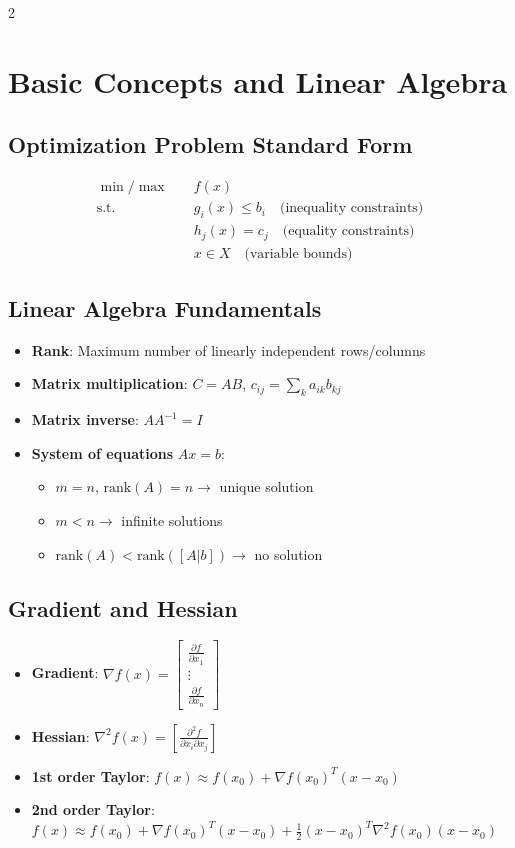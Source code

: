 \documentclass[10pt,a4paper,landscape]{article}
\begin{document}
\begin{multicols}{2}

\section*{Basic Concepts and Linear Algebra}

\subsection*{Optimization Problem Standard Form}
\begin{align}
\min/\max \quad & f(x) \\
\text{s.t.} \quad & g_i(x) \leq b_i \quad \text{(inequality constraints)} \\
& h_j(x) = c_j \quad \text{(equality constraints)} \\
& x \in X \quad \text{(variable bounds)}
\end{align}

\subsection*{Linear Algebra Fundamentals}
\begin{itemize}
\item \textbf{Rank}: Maximum number of linearly independent rows/columns
\item \textbf{Matrix multiplication}: $C = AB$, $c_{ij} = \sum_k a_{ik}b_{kj}$
\item \textbf{Matrix inverse}: $AA^{-1} = I$
\item \textbf{System of equations} $Ax = b$:
  \begin{itemize}
  \item $m = n$, $\text{rank}(A) = n \rightarrow$ unique solution
  \item $m < n \rightarrow$ infinite solutions
  \item $\text{rank}(A) < \text{rank}([A|b]) \rightarrow$ no solution
  \end{itemize}
\end{itemize}

\subsection*{Gradient and Hessian}
\begin{itemize}
\item \textbf{Gradient}: $\nabla f(x) = \begin{bmatrix} \frac{\partial f}{\partial x_1} \\ \vdots \\ \frac{\partial f}{\partial x_n} \end{bmatrix}$
\item \textbf{Hessian}: $\nabla^2 f(x) = \left[\frac{\partial^2 f}{\partial x_i \partial x_j}\right]$
\item \textbf{1st order Taylor}: $f(x) \approx f(x_0) + \nabla f(x_0)^T(x - x_0)$
\item \textbf{2nd order Taylor}: $f(x) \approx f(x_0) + \nabla f(x_0)^T(x - x_0) + \frac{1}{2}(x - x_0)^T\nabla^2 f(x_0)(x - x_0)$
\end{itemize}


\end{multicols}
\end{document}
